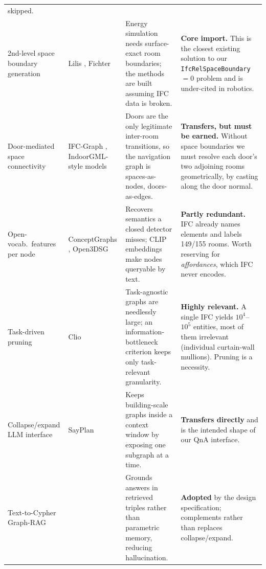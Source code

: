 \documentclass[10pt,twocolumn,letterpaper]{article}
\begin{document}
\begin{tabular}{p{2.45cm} p{3.5cm} p{4.6cm} p{4.6cm}}
skipped. \\
\addlinespace
2nd-level space boundary generation &
Lilis \cite{lilis2017spaceboundary}, Fichter \cite{fichter2021spaceboundary} &
Energy simulation needs surface-exact room boundaries; the methods are built
assuming IFC data is broken. &
\textbf{Core import.} This is the closest existing solution to our
\texttt{IfcRelSpaceBoundary}${=}0$ problem and is under-cited in robotics. \\
\addlinespace
Door-mediated space connectivity &
IFC-Graph \cite{zhu2025ifcgraph}, IndoorGML-style models &
Doors are the only legitimate inter-room transitions, so the navigation graph is
spaces-as-nodes, doors-as-edges. &
\textbf{Transfers, but must be earned.} Without space boundaries we must resolve
each door's two adjoining rooms geometrically, by casting along the door normal. \\
\addlinespace
Open-vocab.\ features per node &
ConceptGraphs \cite{gu2023conceptgraphs}, Open3DSG \cite{koch2024open3dsg} &
Recovers semantics a closed detector misses; CLIP embeddings make nodes
queryable by text. &
\textbf{Partly redundant.} IFC already names elements and labels 149/155 rooms.
Worth reserving for \emph{affordances}, which IFC never encodes. \\
\addlinespace
Task-driven pruning &
Clio \cite{maggio2024clio} &
Task-agnostic graphs are needlessly large; an information-bottleneck criterion
keeps only task-relevant granularity. &
\textbf{Highly relevant.} A single IFC yields $10^4$--$10^5$ entities, most of
them irrelevant (individual curtain-wall mullions). Pruning is a necessity. \\
\addlinespace
Collapse/expand LLM interface &
SayPlan \cite{rana2023sayplan} &
Keeps building-scale graphs inside a context window by exposing one subgraph at
a time. &
\textbf{Transfers directly} and is the intended shape of our QnA interface. \\
\addlinespace
Text-to-Cypher Graph-RAG &
\cite{iranmanesh2025graphrag} &
Grounds answers in retrieved triples rather than parametric memory, reducing
hallucination. &
\textbf{Adopted} by the design specification; complements rather than replaces
collapse/expand. \\
\bottomrule
\end{tabular}
\label{tab:components}
\par\endgroup
\medskip
\end{document}
